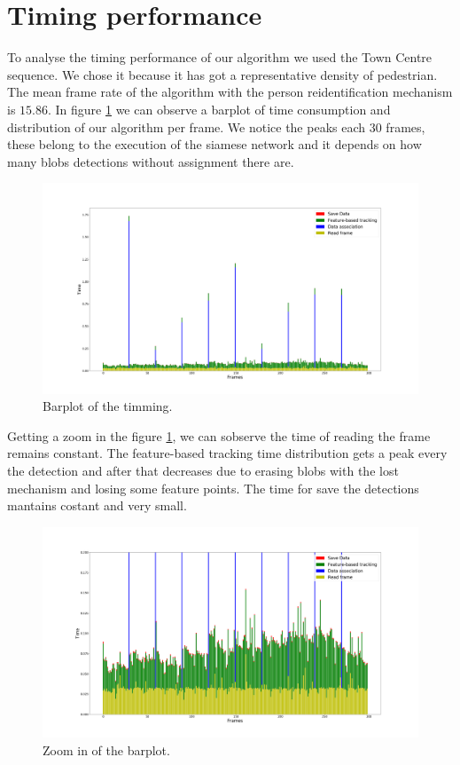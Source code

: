 \section{Timing performance}\label{expeEVAL}


To analyse the timing performance of our algorithm we used the Town Centre sequence. We chose it because it has got a representative density of pedestrian. The mean frame rate of the algorithm with the person reidentification mechanism is $15.86$. In figure \ref{timing1} we can observe a barplot of time consumption and distribution of our algorithm per frame.  We notice the peaks each $30$ frames, these belong to the execution of the siamese network and it depends on how many blobs detections without assignment there are.

\begin{figure}[H]
\centering         
\includegraphics[width=0.9\linewidth]{graphicsRearrange/temps/figure4.png}
\caption{Barplot of the timming.} \label{timing1}
\end{figure}

Getting a zoom in the figure \ref{timing1}, we can sobserve the time of reading the frame remains constant. The feature-based tracking time distribution gets a peak every the detection and after that decreases due to erasing blobs with the lost mechanism and losing some feature points. The time for save the detections mantains costant and very small. 

\begin{figure}[H]
\centering         
\includegraphics[width=0.9\linewidth]{graphicsRearrange/temps/framezomm4.png}
\caption{Zoom in of the barplot.} \label{timing2}
\end{figure}



